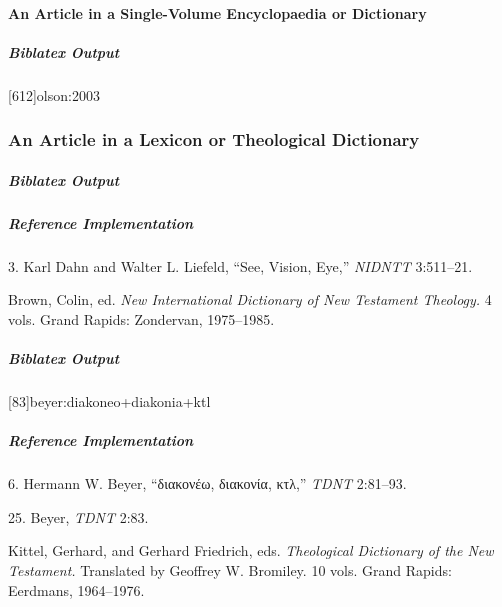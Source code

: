 \documentclass[a4paper]{article}
\newcommand{\textgreek}[1]{{\greekfont #1}}
\newenvironment{biboutput}{%
  \subparagraph{Biblatex Output}
}{\color{black}}
\newenvironment{refimp}{%
  \subparagraph{Reference Implementation}
  \color{reference-colour}
  \rm
}{\par\color{black}}
\begin{document}
\paragraph{An Article in a Single-Volume Encyclopaedia or Dictionary}

\begin{biboutput}
  [612]{olson:2003}
\end{biboutput}

\subsubsection{An Article in a Lexicon or Theological Dictionary}

\begin{biboutput}
\end{biboutput}

\begin{refimp}
  \hspace*{\bibindent}3. Karl Dahn and Walter L. Liefeld, “See, Vision, Eye,”
  \emph{NIDNTT} 3:511–21.

  \hangindent\bibindent Brown, Colin, ed. \emph{New International Dictionary
  of New Testament Theology.} 4 vols. Grand Rapids: Zondervan, 1975–1985.

\end{refimp}

\begin{biboutput}
  [83]{beyer:diakoneo+diakonia+ktl}
\end{biboutput}

\begin{refimp}
  \hspace*{\bibindent}6. Hermann W. Beyer, “\textgreek{διακονέω, διακονία, κτλ},”
  \emph{TDNT} 2:81–93.

  \hspace*{\bibindent}25. Beyer, \emph{TDNT} 2:83.

  \hangindent\bibindent Kittel, Gerhard, and Gerhard Friedrich, eds.
  \emph{Theological Dictionary of the New Testament.} Translated by Geoffrey
  W. Bromiley. 10 vols. Grand Rapids: Eerdmans, 1964–1976.

\end{refimp}
\end{document}
